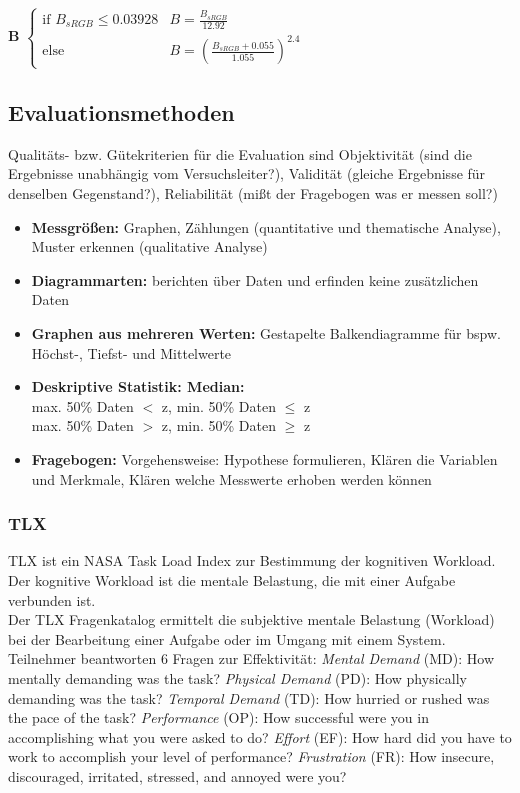\documentclass[12pt,landscape]{article}
\begin{document}
\begin{multicols}{3}
\textbf{B} \colonequals
$\begin{cases}
 \text{if } B_{sRGB} \leq 0.03928 & B = \frac{B_{sRGB}}{12.92} \\
 \text{else } & B=(\frac{B_{sRGB}+0.055}{1.055}) ^ {2.4}
\end{cases}$
\subsection{Evaluationsmethoden}
Qualitäts- bzw. Gütekriterien für die Evaluation sind Objektivität (sind die Ergebnisse unabhängig vom Versuchsleiter?), Validität (gleiche Ergebnisse für denselben Gegenstand?), Reliabilität (mißt der Fragebogen was er messen soll?)
\begin{itemize}
    \item \textbf{Messgrößen:} Graphen, Zählungen (quantitative und thematische Analyse), Muster erkennen (qualitative Analyse)
    \item \textbf{Diagrammarten:} berichten über Daten und erfinden keine zusätzlichen Daten
    \item \textbf{Graphen aus mehreren Werten:} Gestapelte Balkendiagramme für bspw. Höchst-, Tiefst- und Mittelwerte
    \item \textbf{Deskriptive Statistik: Median:} \\
    max. 50\% Daten $<$ z, min. 50\% Daten $\leq$ z\\
    max. 50\% Daten $>$ z, min. 50\% Daten $\geq$ z
    \item \textbf{Fragebogen:} Vorgehensweise: Hypothese formulieren, Klären die Variablen und Merkmale, Klären welche Messwerte erhoben werden können
\end{itemize}
\subsubsection{TLX}
TLX ist ein NASA Task Load Index zur Bestimmung der kognitiven Workload. Der kognitive Workload ist die mentale Belastung, die mit einer Aufgabe verbunden ist.\\
Der TLX Fragenkatalog ermittelt die subjektive mentale Belastung (Workload) bei der Bearbeitung einer Aufgabe oder im Umgang mit einem System. Teilnehmer beantworten 6 Fragen zur 
Effektivität:  \textit{Mental Demand} (MD): How mentally demanding was the task? \textit{Physical Demand} (PD): How physically demanding was the task? \textit{Temporal Demand} (TD): How hurried or rushed was the pace of the task? \textit{Performance} (OP): How successful were you in accomplishing what you were asked to do? \textit{Effort} (EF): How hard did you have to work to accomplish your level of performance? \textit{Frustration} (FR): How insecure, discouraged, irritated, stressed, and annoyed were you?

\end{multicols}
\end{document}
